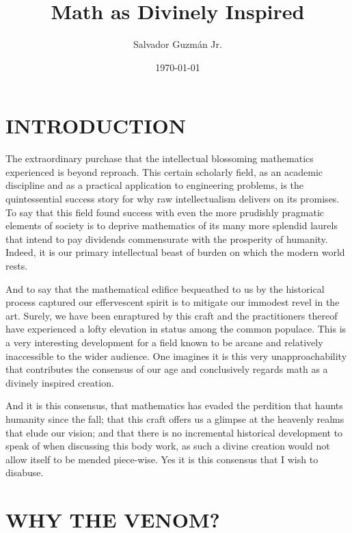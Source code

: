\documentclass[ms,a4paper]{memoir}
\newcommand{\RED}[1]{\textcolor{red!50!black}{\MakeUppercase{#1}}}
\begin{document}
	\title{\textbf{Math as Divinely Inspired}}
	
	\author{Salvador Guzm\'{a}n Jr.}
	\date{\today}
	\maketitle
	
	\pagebreak
	
	\pagebreak
	\tableofcontents
	\pagebreak
	
	\chapter{\RED{Introduction}}
	The extraordinary purchase that the intellectual blossoming mathematics experienced is beyond reproach. This certain scholarly field, as an academic discipline and as a practical application to engineering problems, is the quintessential success story for why raw intellectualism delivers on its promises. To say that this field found success with even the more prudishly pragmatic elements of society is to deprive mathematics of its many more splendid laurels that intend to pay dividends commensurate with the prosperity of humanity. Indeed, it is our primary intellectual beast of burden on which the modern world rests.
	
	And to say that the mathematical edifice bequeathed to us by the historical process captured our effervescent spirit is to mitigate our immodest revel in the art. Surely, we have been enraptured by this craft and the practitioners thereof have experienced a lofty elevation in status among the common populace. This is a very interesting development for a field known to be arcane and relatively inaccessible to the wider audience. One imagines it is this very unapproachability that contributes the consensus of our age and conclusively regards math as a divinely inspired creation.
	
	And it is this consensus, that mathematics has evaded the perdition that haunts humanity since the fall; that this craft offers us a glimpse at the heavenly realms that elude our vision; and that there is no incremental historical development to speak of when discussing this body work, as such a divine creation would not allow itself to be mended piece-wise. Yes it is this consensus that I wish to disabuse.
	
	\chapter{\RED{Why the Venom?}}
\end{document}
